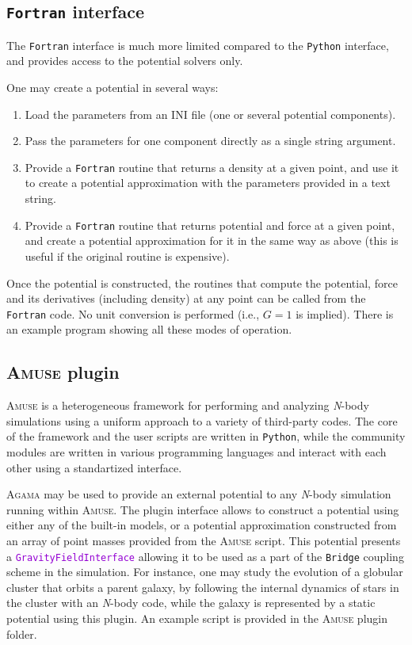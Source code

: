 \documentclass[12pt]{article}
\newcommand{\Agama}{\textsc{Agama}\xspace}
\newcommand{\Amuse}{\textsc{Amuse}\xspace}
\newcommand{\Nbody}{\textsl{N}-body\xspace}
\newcommand{\Python}{\texttt{Python}\xspace}
\newcommand{\Fortran}{\texttt{Fortran}\xspace}
\newcommand{\ttt}[1]{\textcolor{darkviolet}{\texttt{#1}}}
\begin{document}
\subsection{\Fortran interface}  \label{sec:Fortran}

The \Fortran interface is much more limited compared to the \Python interface, and provides access to the potential solvers only. 

One may create a potential in several ways:
\begin{enumerate}  \setlength{\parskip}{2pt} \setlength{\itemsep}{2pt}
\item Load the parameters from an INI file (one or several potential components).
\item Pass the parameters for one component directly as a single string argument.
\item Provide a \Fortran routine that returns a density at a given point, and use it to create a potential approximation with the parameters provided in a text string.
\item Provide a \Fortran routine that returns potential and force at a given point, and create a potential approximation for it in the same way as above (this is useful if the original routine is expensive).
\end{enumerate}
Once the potential is constructed, the routines that compute the potential, force and its derivatives (including density) at any point can be called from the \Fortran code. No unit conversion is performed (i.e., $G=1$ is implied).
There is an example program showing all these modes of operation.

\subsection{\Amuse plugin}  \label{sec:Amuse}

\Amuse \cite{PortegiesZwart2013} is a heterogeneous framework for performing and analyzing \Nbody simulations using a uniform approach to a variety of third-party codes. The core of the framework and the user scripts are written in \Python, while the community modules are written in various programming languages and interact with each other using a standartized interface.

\Agama may be used to provide an external potential to any \Nbody simulation running within \Amuse. The plugin interface allows to construct a potential using either any of the built-in models, or a potential approximation constructed from an array of point masses provided from the \Amuse script. This potential presents a \ttt{GravityFieldInterface} allowing it to be used as a part of the \texttt{Bridge} coupling scheme in the simulation. For instance, one may study the evolution of a globular cluster that orbits a parent galaxy, by following the internal dynamics of stars in the cluster with an \Nbody code, while the galaxy is represented by a static potential using this plugin.
An example script is provided in the \Amuse plugin folder.
\end{document}
